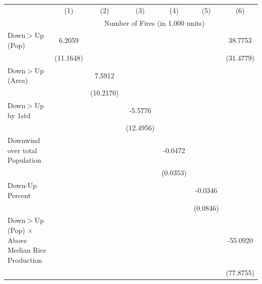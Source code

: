 \begin{tabular}{lcccccc}
\hline
& (1) & (2) & (3) & (4) & (5) & (6)\\
& \multicolumn{6}{c}{Number of Fires (in 1,000 units) }\\
\hline

Down$>$Up (Pop)&      6.2059         &                     &                     &                     &                     &     38.7753         \\
            &   (11.1648)         &                     &                     &                     &                     &   (31.4779)         \\
Down$>$Up (Area)&                     &      7.5912         &                     &                     &                     &                     \\
            &                     &   (10.2170)         &                     &                     &                     &                     \\
Down$>$Up by 1std&                     &                     &     -5.5776         &                     &                     &                     \\
            &                     &                     &   (12.4956)         &                     &                     &                     \\
Downwind over total Population&                     &                     &                     &     -0.0472         &                     &                     \\
            &                     &                     &                     &    (0.0353)         &                     &                     \\
Down-Up Percent&                     &                     &                     &                     &     -0.0346         &                     \\
            &                     &                     &                     &                     &    (0.0846)         &                     \\
Down$>$Up (Pop) $\times$ Above Median Rice Production&                     &                     &                     &                     &                     &    -55.0920         \\
            &                     &                     &                     &                     &                     &   (77.8755)         \\

\end{tabular}
